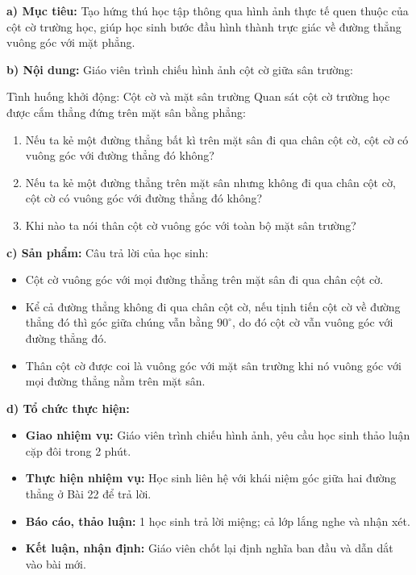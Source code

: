 \documentclass[12pt, a4paper]{article}
\begin{document}
\noindent \textbf{a) Mục tiêu:}
Tạo hứng thú học tập thông qua hình ảnh thực tế quen thuộc của cột cờ trường học, giúp học sinh bước đầu hình thành trực giác về đường thẳng vuông góc với mặt phẳng.

\noindent \textbf{b) Nội dung:}
Giáo viên trình chiếu hình ảnh cột cờ giữa sân trường:
\begin{pedabox}{Tình huống khởi động: Cột cờ và mặt sân trường}
Quan sát cột cờ trường học được cắm thẳng đứng trên mặt sân bằng phẳng:
\begin{enumerate}[leftmargin=0.6cm]
    \item Nếu ta kẻ một đường thẳng bất kì trên mặt sân đi qua chân cột cờ, cột cờ có vuông góc với đường thẳng đó không?
    \item Nếu ta kẻ một đường thẳng trên mặt sân nhưng không đi qua chân cột cờ, cột cờ có vuông góc với đường thẳng đó không?
    \item Khi nào ta nói thân cột cờ vuông góc với toàn bộ mặt sân trường?
\end{enumerate}
\end{pedabox}

\noindent \textbf{c) Sản phẩm:}
Câu trả lời của học sinh:
\begin{itemize}
    \item Cột cờ vuông góc với mọi đường thẳng trên mặt sân đi qua chân cột cờ.
    \item Kể cả đường thẳng không đi qua chân cột cờ, nếu tịnh tiến cột cờ về đường thẳng đó thì góc giữa chúng vẫn bằng $90^\circ$, do đó cột cờ vẫn vuông góc với đường thẳng đó.
    \item Thân cột cờ được coi là vuông góc với mặt sân trường khi nó vuông góc với mọi đường thẳng nằm trên mặt sân.
\end{itemize}

\noindent \textbf{d) Tổ chức thực hiện:}
\begin{itemize}[leftmargin=0.6cm]
    \item \textbf{Giao nhiệm vụ:} Giáo viên trình chiếu hình ảnh, yêu cầu học sinh thảo luận cặp đôi trong 2 phút.
    \item \textbf{Thực hiện nhiệm vụ:} Học sinh liên hệ với khái niệm góc giữa hai đường thẳng ở Bài 22 để trả lời.
    \item \textbf{Báo cáo, thảo luận:} 1 học sinh trả lời miệng; cả lớp lắng nghe và nhận xét.
    \item \textbf{Kết luận, nhận định:} Giáo viên chốt lại định nghĩa ban đầu và dẫn dắt vào bài mới.
\end{itemize}
\end{document}
